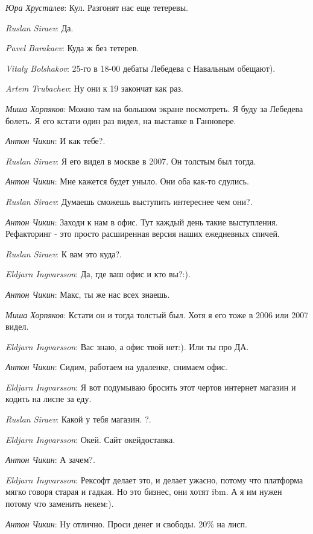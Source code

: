 \documentclass[10pt]{book}
\newcommand{\AUTHOR}[1]{\emph{#1}:}
\begin{document}
\AUTHOR{Юра Хрусталев} Кул. Разгонят нас еще тетеревы.

\AUTHOR{Ruslan Siraev} Да.

\AUTHOR{Pavel Barakaev} Куда ж без тетерев.

\AUTHOR{Vitaly Bolshakov} 25-го в 18-00 дебаты Лебедева с Навальным обещают).

\AUTHOR{Artem Trubachev} Ну они к 19 закончат как раз.

\AUTHOR{Миша Хорпяков} Можно там на большом экране посмотреть. Я буду за Лебедева болеть. Я его кстати один раз видел, на выставке в Ганновере.

\AUTHOR{Антон Чикин} И как тебе?.

\AUTHOR{Ruslan Siraev} Я его видел в москве в 2007. Он толстым был тогда.

\AUTHOR{Антон Чикин} Мне кажется будет уныло. Они оба как-то сдулись.

\AUTHOR{Ruslan Siraev} Думаешь сможешь выступить интереснее чем они?.

\AUTHOR{Антон Чикин} Заходи к нам в офис. Тут каждый день такие выступления. Рефакторинг - это просто расширенная версия наших ежедневных спичей.

\AUTHOR{Ruslan Siraev} К вам это куда?.

\AUTHOR{Eldjarn Ingvarsson} Да, где ваш офис и кто вы?:).

\AUTHOR{Антон Чикин} Макс, ты же нас всех знаешь.

\AUTHOR{Миша Хорпяков} Кстати он и тогда толстый был. Хотя я его тоже в 2006 или 2007 видел.

\AUTHOR{Eldjarn Ingvarsson} Вас знаю, а офис твой нет:). Или ты про ДА.

\AUTHOR{Антон Чикин} Сидим, работаем на удаленке, снимаем офис.

\AUTHOR{Eldjarn Ingvarsson} Я вот подумываю бросить этот чертов интернет магазин и кодить на лиспе за еду.

\AUTHOR{Ruslan Siraev} Какой у тебя магазин. ?.

\AUTHOR{Eldjarn Ingvarsson} Окей. Сайт окейдоставка.

\AUTHOR{Антон Чикин} А зачем?.

\AUTHOR{Eldjarn Ingvarsson} Рексофт делает это, и делает ужасно, потому что платформа мягко говоря старая и гадкая. Но это бизнес, они хотят ibm. А я им нужен потому что заменить некем:).

\AUTHOR{Антон Чикин} Ну отлично. Проси денег и свободы. 20\% на лисп.
\end{document}
